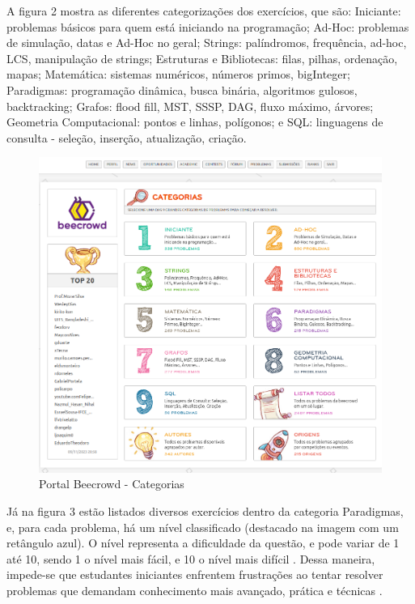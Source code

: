 A figura 2 mostra as diferentes categorizações dos exercícios, que são: Iniciante: problemas básicos para quem está iniciando na programação; Ad-Hoc: problemas de simulação, datas e Ad-Hoc no geral; Strings: palíndromos, frequência, ad-hoc, LCS, manipulação de strings; Estruturas e Bibliotecas: filas, pilhas, ordenação, mapas; Matemática: sistemas numéricos, números primos, bigInteger; Paradigmas: programação dinâmica, busca binária, algoritmos gulosos, backtracking; Grafos: flood fill, MST, SSSP, DAG, fluxo máximo, árvores; Geometria Computacional: pontos e linhas, polígonos; e SQL: linguagens de consulta - seleção, inserção, atualização, criação.

\begin{figure}[h!]
	   \centering
            \caption{Portal Beecrowd - Categorias}
            \label{fig:ModeloConceitual}
	   	\includegraphics[scale=0.3]{pictures/beecrowd_problemas.png}
\end{figure}

Já na figura 3 estão listados diversos exercícios dentro da categoria Paradigmas, e, para cada problema, há um nível classificado (destacado na imagem com um retângulo azul). O nível representa a dificuldade da questão, e pode variar de 1 até 10, sendo 1 o nível mais fácil, e 10 o nível mais difícil \cite{beecrowd}. Dessa maneira, impede-se que estudantes iniciantes enfrentem frustrações ao tentar resolver problemas que demandam conhecimento mais avançado, prática e técnicas \cite[p.~239]{beztonin2014}.

